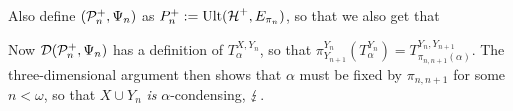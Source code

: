\documentclass[../../main]{subfiles}
\begin{document}
{  Also define $(\P_n^+,\Psi_n)$ as $P_n^+:=\ult(\h^+,E_{\pi_n})$, so that we also get that

  Now $\D(\P_n^+,\Psi_n)$ has a definition of $T^{X,Y_n}_\alpha$, so that $\pi^{Y_n}_{Y_{n+1}}(T^{Y_n}_\alpha)=T^{Y_n,Y_{n+1}}_{\pi_{n,n+1}(\alpha)}$. The three-dimensional argument  then shows that $\alpha$ must be fixed by $\pi_{n,n+1}$ for some $n<\omega$, so that $X\cup Y_n$ \textit{is} $\alpha$-condensing, $\contr$.
}

\end{document}
